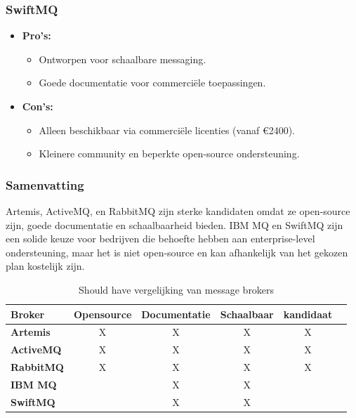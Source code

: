 \subsubsection{SwiftMQ}
\begin{itemize}
    \item \textbf{Pro's:}
    \begin{itemize}
        \item Ontworpen voor schaalbare messaging.
        \item Goede documentatie voor commerciële toepassingen.
    \end{itemize}
    \item \textbf{Con's:}
    \begin{itemize}
        \item Alleen beschikbaar via commerciële licenties (vanaf €2400).
        \item Kleinere community en beperkte open-source ondersteuning.
    \end{itemize}
\end{itemize}

\subsubsection{Samenvatting}
Artemis, ActiveMQ, en RabbitMQ zijn sterke kandidaten omdat ze open-source zijn,
goede documentatie en schaalbaarheid bieden.
IBM MQ en SwiftMQ zijn een solide keuze voor bedrijven die behoefte hebben aan enterprise-level ondersteuning, 
maar het is niet open-source en kan afhankelijk van het gekozen plan kostelijk zijn.


\begin{table}[h!]
  \centering
  \footnotesize
\begin{tabular}{|l|c|c|c|c|c|}
  \hline
  \textbf{Broker} & \textbf{Opensource} & \textbf{Documentatie} & \textbf{Schaalbaar} & \textbf{kandidaat}\\ \hline
  \textbf{Artemis}   & X & X & X & X \\ \hline
  \textbf{ActiveMQ}  & X & X & X & X \\ \hline
  \textbf{RabbitMQ}  & X & X & X & X \\ \hline  
  \textbf{IBM MQ}    &   & X & X &  \\ \hline 
  \textbf{SwiftMQ}   &   & X & X &  \\ \hline 
\end{tabular}
\caption{Should have vergelijking van message brokers}
\label{tab:vergelijking_message_brokers_should_have}
\end{table}
    
